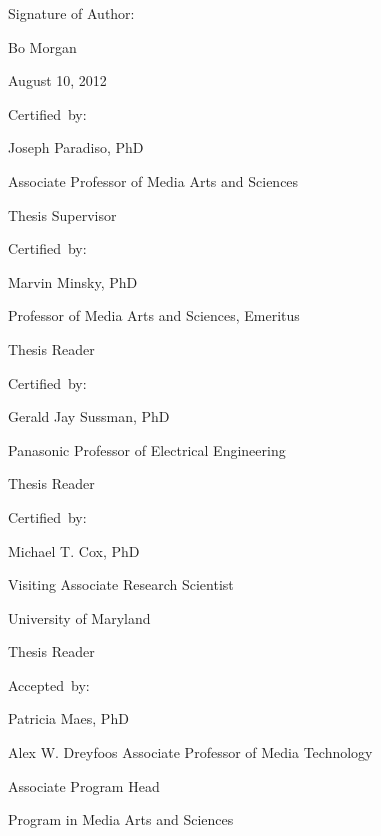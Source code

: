 \begin{addmargin}[-1cm]{-3.5cm}

\begin{flushright}
  \vspace{5mm}

{\small
  Signature of Author:\hspace{0.5cm}~\makebox[2.75in]{\hrulefill}

Bo Morgan

August 10, 2012
                          
  \vspace{5mm}
  
  Certified~by:\hspace{0.5cm}~\makebox[2.75in]{\hrulefill}

Joseph Paradiso, PhD

Associate Professor of Media Arts and Sciences 
                                 
Thesis Supervisor

  \vspace{5mm}
  
  Certified~by:\hspace{0.5cm}~\makebox[2.75in]{\hrulefill}
  
Marvin Minsky, PhD

Professor of Media Arts and Sciences, Emeritus

Thesis Reader

  \vspace{5mm}

  Certified~by:\hspace{0.5cm}~\makebox[2.75in]{\hrulefill}
  
Gerald Jay Sussman, PhD

Panasonic Professor of Electrical Engineering
                                 
Thesis Reader

  \vspace{5mm}

  Certified~by:\hspace{0.5cm}~\makebox[2.75in]{\hrulefill}

Michael T. Cox, PhD

Visiting Associate Research Scientist
                                 
University of Maryland

Thesis Reader

  \vspace{5mm}

  Accepted~by:\hspace{0.5cm}~\makebox[2.75in]{\hrulefill}

Patricia Maes, PhD

Alex W. Dreyfoos Associate Professor of Media Technology

Associate Program Head 

Program in Media Arts and Sciences
}
                                 
\end{flushright}

\end{addmargin}

